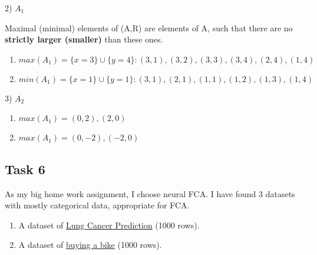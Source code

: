 2) $A_1$

Maximal (minimal) elements of (A,R) are elements of A, such that there are no \textbf{strictly larger (smaller)} than these ones.

\begin{enumerate}
\item $max(A_1) = \{x = 3\} \cup \{y = 4\}: (3, 1), (3, 2), (3, 3), (3, 4), (2, 4), (1, 4)$
\item $min(A_1) = \{x=1\} \cup \{y=1\}: (3, 1), (2, 1), (1, 1), (1, 2), (1, 3), (1, 4) $
\end{enumerate}

3) $A_2$

\begin{enumerate}
\item $max(A_1) = (0,2), (2,0)$
\item $max(A_1) = (0,-2), (-2,0)$
\end{enumerate}

\subsection{Task 6}

As my big home work assignment, I choose neural FCA.
I have found 3 datasets with mostly categorical data, appropriate for FCA.

\begin{enumerate}
\item A dataset of \href{https://www.kaggle.com/datasets/thedevastator/cancer-patients-and-air-pollution-a-new-link}{Lung Cancer Prediction} (1000 rows).
\item A dataset of \href{https://www.kaggle.com/datasets/heeraldedhia/bike-buyers}{buying a bike} (1000 rows).
\end{enumerate}
